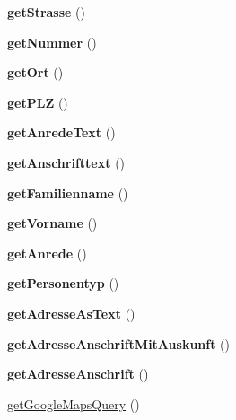 \begin{DoxyCompactItemize}
\item 
\mbox{\label{class_schueler_adresse_a6bfec5fa04298a58d3c661d0d36ac882}} 
{\bfseries get\+Strasse} ()
\item 
\mbox{\label{class_schueler_adresse_a20a51e27c87eb8d7a7eae8281f724b3e}} 
{\bfseries get\+Nummer} ()
\item 
\mbox{\label{class_schueler_adresse_aecad7fec57218bc09a00b4c0936727aa}} 
{\bfseries get\+Ort} ()
\item 
\mbox{\label{class_schueler_adresse_ac875ffede8df3403b3d41ac6dff640ee}} 
{\bfseries get\+P\+LZ} ()
\item 
\mbox{\label{class_schueler_adresse_a23b46a5c18e7e6d283301a9f1ca2ba8b}} 
{\bfseries get\+Anrede\+Text} ()
\item 
\mbox{\label{class_schueler_adresse_a0d87cec87f67dde314bea22805ff9ea7}} 
{\bfseries get\+Anschrifttext} ()
\item 
\mbox{\label{class_schueler_adresse_a5d7edb57a97cfaa0bd6a44271f5e366a}} 
{\bfseries get\+Familienname} ()
\item 
\mbox{\label{class_schueler_adresse_a59fd6b544ab26a2365b9deb1af10b824}} 
{\bfseries get\+Vorname} ()
\item 
\mbox{\label{class_schueler_adresse_afd82bf17f96fedad8023cf5ee40d385e}} 
{\bfseries get\+Anrede} ()
\item 
\mbox{\label{class_schueler_adresse_a2e125af879a8bbfa8644aec3b6d10f75}} 
{\bfseries get\+Personentyp} ()
\item 
\mbox{\label{class_schueler_adresse_a18309a2a4b5b3056168344eb5cee3adb}} 
{\bfseries get\+Adresse\+As\+Text} ()
\item 
\mbox{\label{class_schueler_adresse_a6694b964a32d25fdace7925bd76f6958}} 
{\bfseries get\+Adresse\+Anschrift\+Mit\+Auskunft} ()
\item 
\mbox{\label{class_schueler_adresse_a31ccdc67d7ef78e9e78294526b96897c}} 
{\bfseries get\+Adresse\+Anschrift} ()
\item 
\mbox{\hyperlink{class_schueler_adresse_ad1d622017471861ae76e2079649db8f3}{get\+Google\+Maps\+Query}} ()
\end{DoxyCompactItemize}


